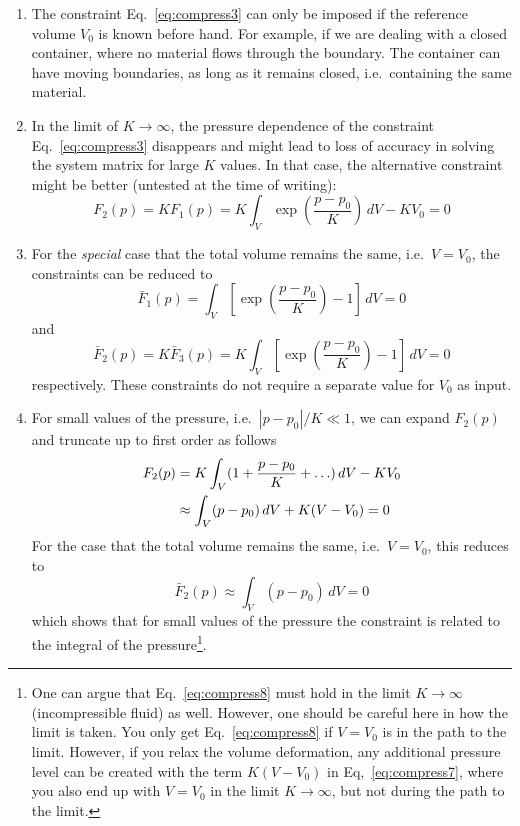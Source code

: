 \begin{enumerate}
\item The constraint Eq.~\eqref{eq:compress3} can only be imposed if the reference volume $V_0$ is known before hand. For example, if we are dealing with a closed container, where no material flows through the boundary. The container can have moving boundaries, as long as it remains closed, i.e.\ containing the same material.
\item In the limit of $K\rightarrow\infty$, the pressure dependence of the constraint Eq.~\eqref{eq:compress3} disappears and might lead to loss of accuracy in solving the system matrix for large $K$ values. In that case, the alternative constraint might be better (untested at the time of writing):
\begin{equation}
  F_2(p)=KF_1(p)=K\int_{V}\exp(\frac{p-p_0}{K})\,dV-KV_0=0
  \label{eq:compress4}
\end{equation}
\item For the \emph{special} case that the total volume remains the same, i.e.\ $V=V_0$, the constraints can be reduced to
\begin{equation}
  \bar F_1(p)=\int_{V}[\exp(\frac{p-p_0}{K})-1]\,dV=0
  \label{eq:compress5}
\end{equation}
and
\begin{equation}
  \bar F_2(p)=K \bar F_3(p)=K\int_{V}[\exp(\frac{p-p_0}{K})-1]\,dV=0
  \label{eq:compress6}
\end{equation}
respectively. These constraints do not require a separate value for $V_0$ as input.
\item
For small values of the pressure, i.e.\ $|p-p_0|/K\ll 1$, we can expand $F_2(p)$ and truncate up to first order as follows
\begin{align}
   F_2(p)&=K\int_{V}(1+\frac{p-p_0}{K}+\ldots)\,dV-KV_0\notag\\
         &\approx\int_V(p-p_0)\,dV+K(V-V_0)=0
\label{eq:compress7}
\end{align}
For the case that the total volume remains the same, i.e.\ $V=V_0$, this reduces to
\begin{equation}
 \bar F_2(p)\approx\int_V(p-p_0)\,dV=0
\label{eq:compress8}
\end{equation}
which shows that for small values of the pressure the constraint is related to the integral of the pressure\footnote{One can argue that Eq.~\eqref{eq:compress8} must hold in the limit $K\rightarrow\infty$ (incompressible fluid) as well. However, one should be careful here in how the limit is taken. You only get 
Eq.~\eqref{eq:compress8} if $V=V_0$ is in the path to the limit. However, if you relax the volume deformation, any
additional pressure level can be created with the term $K(V-V_0)$ in Eq,~\eqref{eq:compress7}, where you also end up with $V=V_0$ in the limit $K\rightarrow\infty$, but not during the path to the limit.}.
\end{enumerate}


